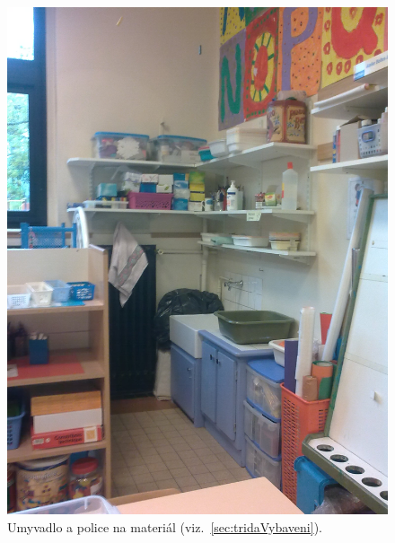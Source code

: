 	\begin{figure}[tb]
		\centering
		\includegraphics[height = 0.35\textheight]{./fotky/Obr4.jpg}
		\caption{
			Umyvadlo a police na materiál (viz.~\ref{sec:tridaVybaveni}).
		}
		\label{Obr4}
	\end{figure}

